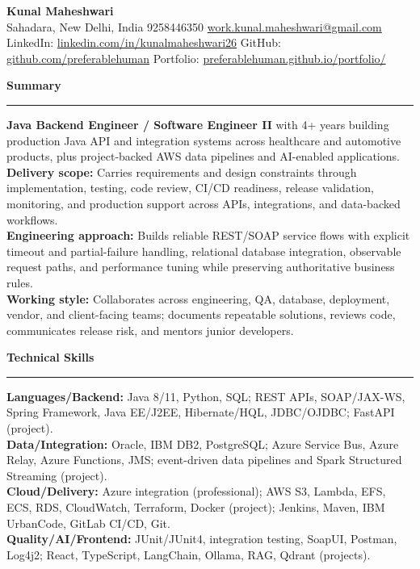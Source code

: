 \documentclass[11pt,letterpaper]{article}
\newcommand{\ressection}[1]{\Needspace{6\baselineskip}\vspace{8pt}\par\textbf{#1}\par\vspace{2pt}\hrule\vspace{5pt}}
\begin{document}
\pagestyle{empty}\raggedright\fontsize{11}{12.5}\selectfont

{\Large \textbf{Kunal Maheshwari}}\\
Sahadara, New Delhi, India \textbar{} 9258446350 \textbar{} \href{mailto:work.kunal.maheshwari@gmail.com}{work.kunal.maheshwari@gmail.com}\\
LinkedIn: \href{https://www.linkedin.com/in/kunalmaheshwari26}{linkedin.com/in/kunalmaheshwari26} \textbar{} GitHub: \href{https://github.com/preferablehuman}{github.com/preferablehuman} \textbar{} Portfolio: \href{https://preferablehuman.github.io/portfolio/}{preferablehuman.github.io/portfolio/}

\ressection{Summary}
\textbf{Java Backend Engineer / Software Engineer II} with 4+ years building production Java API and integration systems across healthcare and automotive products, plus project-backed AWS data pipelines and AI-enabled applications.\\[2pt]
\textbf{Delivery scope:} Carries requirements and design constraints through implementation, testing, code review, CI/CD readiness, release validation, monitoring, and production support across APIs, integrations, and data-backed workflows.\\[2pt]
\textbf{Engineering approach:} Builds reliable REST/SOAP service flows with explicit timeout and partial-failure handling, relational database integration, observable request paths, and performance tuning while preserving authoritative business rules.\\[2pt]
\textbf{Working style:} Collaborates across engineering, QA, database, deployment, vendor, and client-facing teams; documents repeatable solutions, reviews code, communicates release risk, and mentors junior developers.

\ressection{Technical Skills}
\textbf{Languages/Backend:} Java 8/11, Python, SQL; REST APIs, SOAP/JAX-WS, Spring Framework, Java EE/J2EE, Hibernate/HQL, JDBC/OJDBC; FastAPI (project).\\
\textbf{Data/Integration:} Oracle, IBM DB2, PostgreSQL; Azure Service Bus, Azure Relay, Azure Functions, JMS; event-driven data pipelines and Spark Structured Streaming (project).\\
\textbf{Cloud/Delivery:} Azure integration (professional); AWS S3, Lambda, EFS, ECS, RDS, CloudWatch, Terraform, Docker (project); Jenkins, Maven, IBM UrbanCode, GitLab CI/CD, Git.\\
\textbf{Quality/AI/Frontend:} JUnit/JUnit4, integration testing, SoapUI, Postman, Log4j2; React, TypeScript, LangChain, Ollama, RAG, Qdrant (projects).
\end{document}
